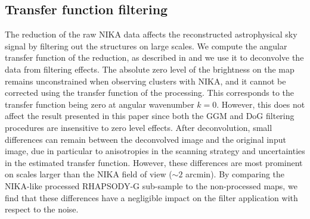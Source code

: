 \documentclass[twocolumn,traditabstract]{aa}
\begin{document}
\subsection{Transfer function filtering}\label{sec:Transfer_function_filtering}
The reduction of the raw NIKA data affects the reconstructed astrophysical sky signal by filtering out the structures on large scales. We compute the angular transfer function of the reduction, as described in \cite{Adam2015} and we use it to deconvolve the data from filtering effects. The absolute zero level of the brightness on the map remains unconstrained when observing clusters with NIKA, and it cannot be corrected using the transfer function of the processing. This corresponds to the transfer function being zero at angular wavenumber $k = 0$. However, this does not affect the result presented in this paper since both the GGM and DoG filtering procedures are insensitive to zero level effects. After deconvolution, small differences can remain between the deconvolved image and the original input image, due in particular to anisotropies in the scanning strategy and uncertainties in the estimated transfer function. However, these differences are most prominent on scales larger than the NIKA field of view ($\sim 2$ arcmin). By comparing the NIKA-like processed RHAPSODY-G sub-sample to the non-processed maps, we find that these differences have a negligible impact on the filter application with respect to the noise.

\end{document}
